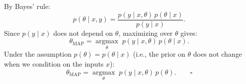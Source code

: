 \begin{answer}
By Bayes' rule:
$$p(\theta \mid x, y) = \frac{p(y \mid x, \theta)\, p(\theta \mid x)}{p(y \mid x)}.$$
Since $p(y \mid x)$ does not depend on $\theta$, maximizing over $\theta$ gives:
$$\theta_{\mathrm{MAP}} = \operatorname*{argmax}_\theta\; p(y \mid x, \theta)\, p(\theta \mid x).$$
Under the assumption $p(\theta) = p(\theta \mid x)$ (i.e., the prior on $\theta$ does not change when we condition on the inputs $x$):
$$\theta_{\mathrm{MAP}} = \operatorname*{argmax}_\theta\; p(y \mid x, \theta)\, p(\theta). \qquad \square$$
\end{answer}
